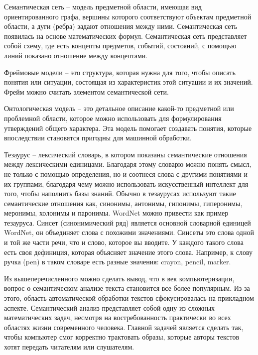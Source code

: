 \begin{itemize}
\begin{itemize}
Семантическая сеть – модель предметной области, имеющая вид
ориентированного графа, вершины которого соответствуют объектам
предметной области, а дуги (ребра) задают отношения между ними.
Семантическая сеть появилась на основе математических формул. Семантическая сеть представляет собой схему, где есть концепты предметов, событий, состояний, с помощью линий показано отношение между
концептами.


Фреймовые модели – это структура, которая нужна для того, чтобы
описать понятия или ситуации, состоящая из характеристик этой ситуации и их значений. Фрейм можно считать элементом семантической
сети.

Онтологическая модель – это детальное описание какой-то предметной или проблемной области, которое можно использовать для
формулирования утверждений общего характера. Эта модель помогает
создавать понятия, которые впоследствии становятся пригодны для машинной обработки.

Тезаурус – лексический словарь, в котором показаны семантические отношения между лексическими единицами.
Благодаря этому словарю можно понять смысл, не только с помощью определения, но и соотнеся слова с другими понятиями и их группами, 
благодаря чему можно использовать искусственный интеллект для того, чтобы наполнить базы знаний. 
Обычно в тезаурусах используют такие семантические
отношения как, синонимы, антонимы, гипонимы, гиперонимы, меронимы, холонимы и паронимы. 
WordNet можно привести как пример тезауруса. 
Синсет (синонимический ряд) является основной словарной единицей WordNet, 
он объединяет слова с похожими значениями. Синсеты
это слова одной и той же части речи, что и слово, которое вы вводите. У
каждого такого слова есть своя дефиниция, которая объясняет значение
этого слова. Например, к слову ручка (pen) в таком словаре есть разные
значения: crayon, pencil, marker.

Из вышеперечисленного можно сделать вывод, что в век компьютеризации, 
вопрос о семантическом анализе текста становится все более
популярным. Из-за этого, область автоматической обработки текстов
сфокусировалась на прикладном аспекте. Семантический анализ представляет 
собой одну из сложных математических задач, несмотря на
востребованность практически во всех областях жизни современного
человека. Главной задачей является сделать так, чтобы компьютер смог
корректно трактовать образы, которые авторы текстов хотят передать
читателям или слушателям. 


\end{itemize}
\end{itemize}
